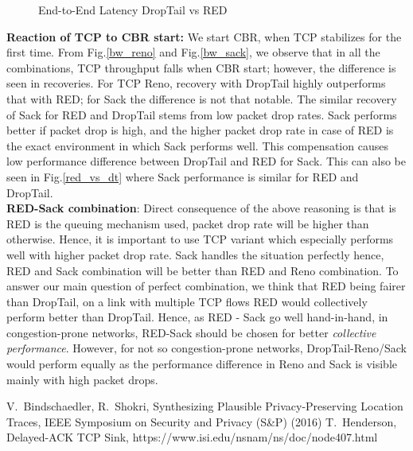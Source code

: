 \documentclass[USenglish,oneside,twocolumn]{article}
\begin{document}
\begin{figure}
\begin{subfigure}{0.48\linewidth}
    \end{subfigure}
\caption{End-to-End Latency DropTail vs RED}
\label{latency}
\end{figure}

\noindent \textbf{Reaction of TCP to CBR start:} We start CBR, when TCP stabilizes for the first time. From Fig.\ref{bw_reno} and Fig.\ref{bw_sack}, we observe that in all the combinations, TCP throughput falls when CBR start; however, the difference is seen in recoveries. For TCP Reno, recovery with DropTail highly outperforms that with RED; for Sack the difference is not that notable. The similar recovery of Sack for RED and DropTail stems from low packet drop rates. Sack performs better if packet drop is high, and the higher packet drop rate in case of RED is the exact environment in which Sack performs well. This compensation causes low performance difference between DropTail and RED for Sack. This can also be seen in Fig.\ref{red_vs_dt} where Sack performance is similar for RED and DropTail.\\

\noindent \textbf{RED-Sack combination}: Direct consequence of the above reasoning is that is RED is the queuing mechanism used, packet drop rate will be higher than otherwise. Hence, it is important to use TCP variant which especially performs well with higher packet drop rate. Sack handles the situation perfectly hence, RED and Sack combination will be better than RED and Reno combination. To answer our main question of perfect combination, we think that RED being fairer than DropTail, on a link with multiple TCP flows RED would collectively perform better than DropTail. Hence, as RED - Sack go well hand-in-hand, in congestion-prone networks, RED-Sack should be chosen for better \textit{collective performance}. However, for not so congestion-prone networks, DropTail-Reno/Sack would perform equally as the performance difference in Reno and Sack is visible mainly with high packet drops.



\begin{thebibliography}{99}
 V.~Bindschaedler, R.~Shokri, Synthesizing Plausible Privacy-Preserving Location Traces, IEEE Symposium on Security and Privacy (S\&P) (2016)
 T.~Henderson, Delayed-ACK TCP Sink, https://www.isi.edu/nsnam/ns/doc/node407.html
\end{thebibliography}
\end{document}
